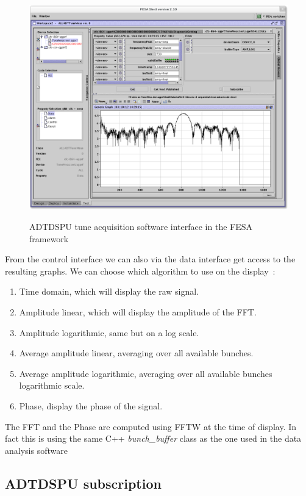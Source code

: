 \begin{figure}[H]
\caption{ADTDSPU tune acquisition software interface in the FESA framework}
\centering
\includegraphics[scale=0.25]{amplitude_log.pdf}
\label{fig:tuneacq}
\end{figure}

From the control interface we can also via the data interface get access to the resulting graphs. We can choose which algorithm to use on the display~:

\begin{enumerate}
\item Time domain, which will display the raw signal.
\item Amplitude linear, which will display the amplitude of the FFT.
\item Amplitude logarithmic, same but on a log scale.
\item Average amplitude linear, averaging over all available bunches.
\item Average amplitude logarithmic, averaging over all available bunches logarithmic scale.
\item Phase, display the phase of the signal.
\end{enumerate}

The FFT and the Phase are computed using FFTW at the time of display. In fact this is using the same C++ \emph{bunch\_buffer} class as the one used in the data analysis software 

\subsection{ADTDSPU subscription}

